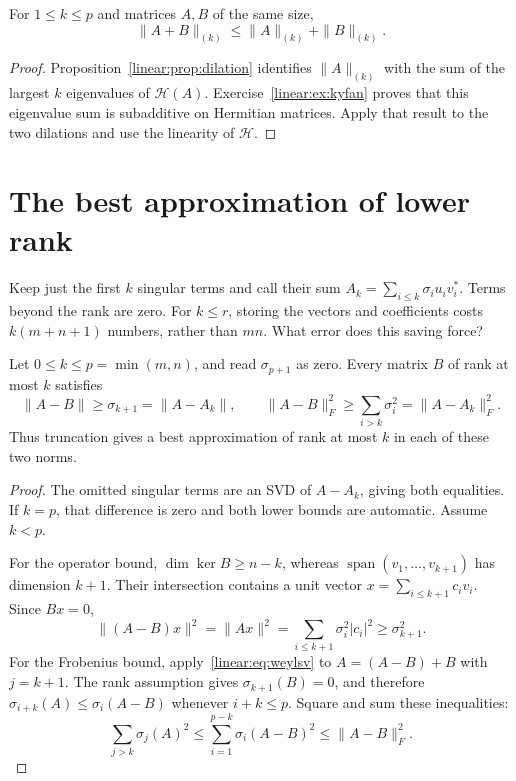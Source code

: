 \begin{proposition}\label{linear:prop:kyfannorm}
For $1\le k\le p$ and matrices $A,B$ of the same size,
\[
\|A+B\|_{(k)}\le\|A\|_{(k)}+\|B\|_{(k)}.
\]
\end{proposition}
\begin{proof}
Proposition~\ref{linear:prop:dilation} identifies $\|A\|_{(k)}$ with the sum of the largest $k$ eigenvalues of $\mathcal H(A)$. Exercise~\ref{linear:ex:kyfan} proves that this eigenvalue sum is subadditive on Hermitian matrices. Apply that result to the two dilations and use the linearity of $\mathcal H$.
\end{proof}

\section{The best approximation of lower rank}

Keep just the first $k$ singular terms and call their sum $A_k=\sum_{i\le k}\sigma_iu_iv_i^*$. Terms beyond the rank are zero. For $k\le r$, storing the vectors and coefficients costs $k(m+n+1)$ numbers, rather than $mn$. What error does this saving force?

\begin{theorem}\label{linear:thm:eckartyoung}
Let $0\le k\le p=\min(m,n)$, and read $\sigma_{p+1}$ as zero. Every matrix $B$ of rank at most $k$ satisfies
\[
\|A-B\|\ge\sigma_{k+1}=\|A-A_k\|,\qquad
\|A-B\|_F^2\ge\sum_{i>k}\sigma_i^2=\|A-A_k\|_F^2.
\]
Thus truncation gives a best approximation of rank at most $k$ in each of these two norms.
\end{theorem}
\begin{proof}
The omitted singular terms are an SVD of $A-A_k$, giving both equalities. If $k=p$, that difference is zero and both lower bounds are automatic. Assume $k<p$.

For the operator bound, $\dim\ker B\ge n-k$, whereas $\operatorname{span}(v_1,\ldots,v_{k+1})$ has dimension $k+1$. Their intersection contains a unit vector $x=\sum_{i\le k+1}c_iv_i$. Since $Bx=0$,
\[
\|(A-B)x\|^2=\|Ax\|^2=\sum_{i\le k+1}\sigma_i^2|c_i|^2\ge\sigma_{k+1}^2.
\]
For the Frobenius bound, apply~\eqref{linear:eq:weylsv} to $A=(A-B)+B$ with $j=k+1$. The rank assumption gives $\sigma_{k+1}(B)=0$, and therefore $\sigma_{i+k}(A)\le\sigma_i(A-B)$ whenever $i+k\le p$. Square and sum these inequalities:
\[
\sum_{j>k}\sigma_j(A)^2\le\sum_{i=1}^{p-k}\sigma_i(A-B)^2\le\|A-B\|_F^2.
\]
\end{proof}

